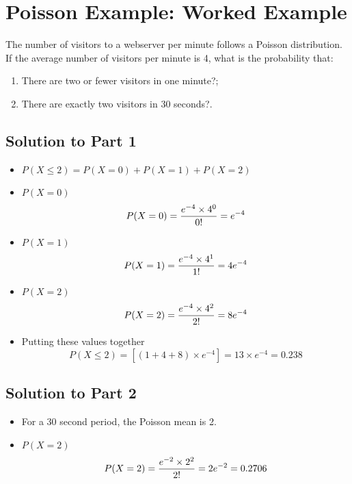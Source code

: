 \documentclass[a4paper,12pt]{article}
\begin{document}
\section*{Poisson Example: Worked Example}

The number of visitors to a webserver per minute follows a Poisson
distribution. If the average number of visitors per minute is 4,
what is the probability that:
\begin{enumerate}
	\item There are two or fewer visitors in one minute?;
	\item There are exactly two visitors in 30 seconds?.
\end{enumerate}






\subsection*{Solution to Part 1}
\begin{itemize}
	\item $P(X\leq 2) = P(X = 0) + P(X = 1) + P(X = 2)$
	\item $P(X = 0)$
	\[P(X = 0) = { e^{-4} \times 4^0\over 0!} = e^{-4}\]
	\item $P(X = 1)$
	\[P(X = 1) = { e^{-4} \times 4^1\over 1!} = 4e^{-4}\]
	\item $P(X = 2)$
	\[P(X = 2) = { e^{-4} \times 4^2\over 2!} = 8e^{-4}\]
	\item Putting these values together
	\[P(X\leq 2) = \left[(1+4+8) \times e^{-4}\right] = 13 \times e^{-4} = 0.238\]
\end{itemize}
\subsection*{Solution to Part 2}
\begin{itemize}
    \item For a 30 second period, the Poisson mean is 2.
   \item $P(X = 2)$
	\[P(X = 2) = { e^{-2} \times 2^2\over 2!} = 2e^{-2} = 0.2706\]
 
\end{itemize}
\end{document}
